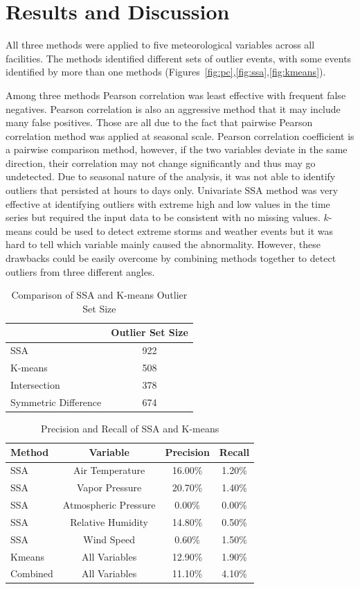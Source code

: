 \section{Results and Discussion}
All three methods were applied to five meteorological variables across
all facilities. The methods identified different sets of outlier events,
with some events identified by more than one methods
(Figures~\ref{fig:pc},\ref{fig:ssa},\ref{fig:kmeans}).

Among three methods Pearson correlation was least effective with
frequent false negatives. Pearson correlation is also an aggressive method that
it may include many false positives. Those are all due to the fact 
that pairwise Pearson correlation method was applied at seasonal scale.
Pearson correlation coefficient is a pairwise comparison method, however, 
if the two variables deviate in the same direction, their correlation 
may not change significantly and thus may go undetected. Due to seasonal
nature of the analysis, it was not able to identify outliers that
persisted at hours to days only. Univariate SSA method was very effective 
at identifying outliers with extreme high and low values in the time series 
but required the input data to be consistent with no missing values.
$k$-means could be used to detect extreme storms and weather events but it was hard
to tell which variable mainly caused the abnormality. However, these drawbacks 
could be easily overcome by combining methods together to detect 
outliers from three different angles.

\begin{table}[ht]
\caption{Comparison of SSA and K-means Outlier Set Size}
\label{tab:comp}
\centering
\begin{tabular}{|l|c|}
\cline{2-2}
\multicolumn{1}{l|}{} & Outlier Set Size\\
\hline
SSA & 922\\
K-means & 508\\
Intersection & 378\\
Symmetric Difference & 674\\
\hline
\end{tabular}
\end{table}

\begin{table}[ht]
\caption{Precision and Recall of SSA and K-means}
\label{tab:pr}
\centering
\begin{tabular}{|l|c|c|c|}
\hline
Method & Variable & Precision & Recall\\
\hline
SSA & Air Temperature & 16.00\% & 1.20\%\\
SSA &  Vapor Pressure & 20.70\% & 1.40\%\\
SSA & Atmospheric Pressure  & 0.00\% & 0.00\%\\
SSA & Relative Humidity & 14.80\% & 0.50\%\\
SSA & Wind Speed & 0.60\% & 1.50\%\\
Kmeans & All Variables & 12.90\% & 1.90\%\\
Combined & All Variables & 11.10\% & 4.10\%\\
\hline
\end{tabular}
\end{table}

